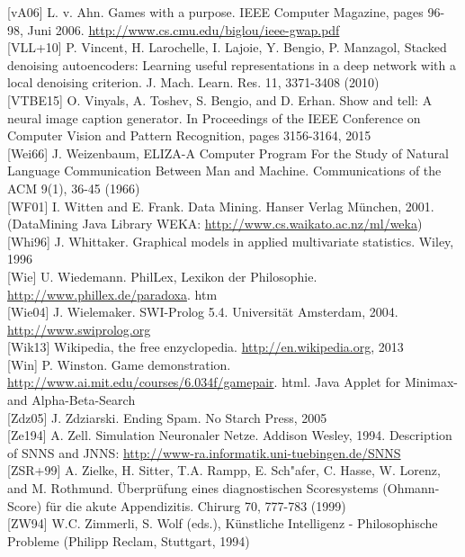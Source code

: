 \documentclass[10pt]{article}
\begin{document}
[vA06] L. v. Ahn. Games with a purpose. IEEE Computer Magazine, pages 96-98, Juni 2006. \href{http://www.cs.cmu.edu/biglou/ieee-gwap.pdf}{http://www.cs.cmu.edu/biglou/ieee-gwap.pdf}\\[0pt]
[VLL+10] P. Vincent, H. Larochelle, I. Lajoie, Y. Bengio, P. Manzagol, Stacked denoising autoencoders: Learning useful representations in a deep network with a local denoising criterion. J. Mach. Learn. Res. 11, 3371-3408 (2010)\\[0pt]
[VTBE15] O. Vinyals, A. Toshev, S. Bengio, and D. Erhan. Show and tell: A neural image caption generator. In Proceedings of the IEEE Conference on Computer Vision and Pattern Recognition, pages 3156-3164, 2015\\[0pt]
[Wei66] J. Weizenbaum, ELIZA-A Computer Program For the Study of Natural Language Communication Between Man and Machine. Communications of the ACM 9(1), 36-45 (1966)\\[0pt]
[WF01] I. Witten and E. Frank. Data Mining. Hanser Verlag München, 2001. (DataMining Java Library WEKA: \href{http://www.cs.waikato.ac.nz/ml/weka}{http://www.cs.waikato.ac.nz/ml/weka})\\[0pt]
[Whi96] J. Whittaker. Graphical models in applied multivariate statistics. Wiley, 1996\\[0pt]
[Wie] U. Wiedemann. PhilLex, Lexikon der Philosophie. \href{http://www.phillex.de/paradoxa}{http://www.phillex.de/paradoxa}. htm\\[0pt]
[Wie04] J. Wielemaker. SWI-Prolog 5.4. Universität Amsterdam, 2004. \href{http://www.swiprolog.org}{http://www.swiprolog.org}\\[0pt]
[Wik13] Wikipedia, the free enzyclopedia. \href{http://en.wikipedia.org}{http://en.wikipedia.org}, 2013\\[0pt]
[Win] P. Winston. Game demonstration. \href{http://www.ai.mit.edu/courses/6.034f/gamepair}{http://www.ai.mit.edu/courses/6.034f/gamepair}. html. Java Applet for Minimax- and Alpha-Beta-Search\\[0pt]
[Zdz05] J. Zdziarski. Ending Spam. No Starch Press, 2005\\[0pt]
[Ze194] A. Zell. Simulation Neuronaler Netze. Addison Wesley, 1994. Description of SNNS and JNNS: \href{http://www-ra.informatik.uni-tuebingen.de/SNNS}{http://www-ra.informatik.uni-tuebingen.de/SNNS}\\[0pt]
[ZSR+99] A. Zielke, H. Sitter, T.A. Rampp, E. Sch"afer, C. Hasse, W. Lorenz, and M. Rothmund. Überprüfung eines diagnostischen Scoresystems (Ohmann-Score) für die akute Appendizitis. Chirurg 70, 777-783 (1999)\\[0pt]
[ZW94] W.C. Zimmerli, S. Wolf (eds.), Künstliche Intelligenz - Philosophische Probleme (Philipp Reclam, Stuttgart, 1994)
\end{document}
